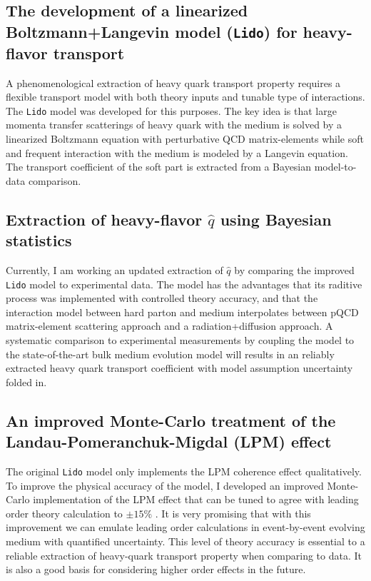 \documentclass[10pt,a4paper]{article}
\begin{document}
\subsection{The development of a linearized Boltzmann+Langevin model ({\tt Lido}) for heavy-flavor transport}

A phenomenological extraction of heavy quark transport property requires a flexible transport model with both theory inputs and tunable type of interactions. 
The {\tt Lido} model \cite{Ke:2018tsh, Ke:2018jem} was developed for this purposes. The key idea is that large momenta transfer scatterings of heavy quark with the medium is solved by a linearized Boltzmann equation with perturbative QCD matrix-elements while soft and frequent interaction with the medium is modeled by a Langevin equation. The transport coefficient of the soft part is extracted from a Bayesian model-to-data comparison.

\subsection{Extraction of heavy-flavor $\hat{q}$ using Bayesian statistics}

Currently, I am working an updated extraction of $\hat{q}$ by comparing the improved {\tt Lido} model to experimental data. 
The model has the advantages that its raditive process was implemented with controlled theory accuracy, and that the interaction model between hard parton and medium interpolates between pQCD matrix-element scattering approach and a radiation+diffusion approach. 
A systematic comparison to experimental measurements by coupling the model to the state-of-the-art bulk medium evolution model will results in an reliably extracted heavy quark transport coefficient with model assumption uncertainty folded in.

\subsection{An improved Monte-Carlo treatment of the Landau-Pomeranchuk-Migdal (LPM) effect}

The original {\tt Lido} model only implements the LPM coherence effect qualitatively. To improve the physical accuracy of the model, I developed an improved Monte-Carlo implementation of the LPM effect that can be tuned to agree with leading order theory calculation to $\pm 15\%$ \cite{Ke:2018jem}. It is very promising that with this improvement we can emulate leading order calculations in event-by-event evolving medium with quantified uncertainty.
This level of theory accuracy is essential to a reliable extraction of heavy-quark transport property when comparing to data. It is also a good basis for considering higher order effects in the future.
\end{document}

